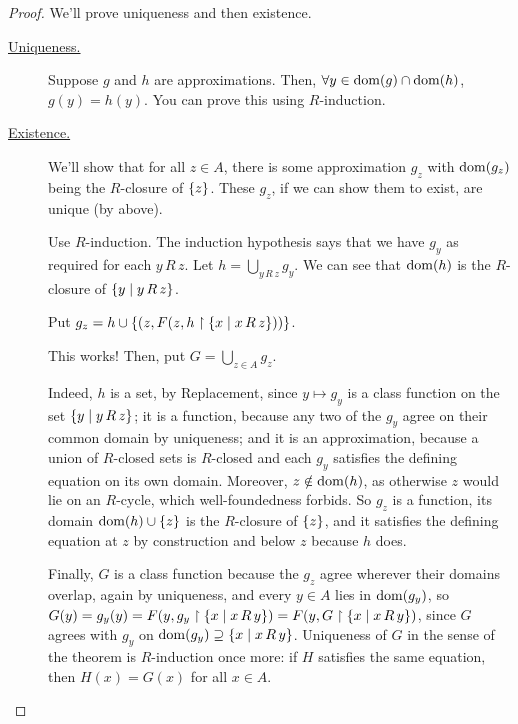 \begin{proof}
    We'll prove uniqueness and then existence.

    \begin{description}
        \item[\underline{Uniqueness.}]
            Suppose $g$ and $h$ are approximations. Then, $\forall y \in \operatorname{dom}\!\left( g \right) \cap \operatorname{dom}\!\left( h \right)$, $g(y) = h(y)$. You can prove this using $R$-induction.

        \item[\underline{Existence.}]
            We'll show that for all $z \in A$, there is some approximation $g_z$ with $\operatorname{dom}\!\left( g_z \right)$ being the $R$-closure of $\left\{ z \right\}$. These $g_z$, if we can show them to exist, are unique (by above).

            Use $R$-induction. The induction hypothesis says that we have $g_y$ as required for each $y \, R \, z$. Let $h = \bigcup_{y \, R \, z} g_y$. We can see that $\operatorname{dom}\!\left( h \right)$ is the $R$-closure of $\left\{ y \; \middle\vert \; y \, R \, z \right\}$.

            Put $g_z = h \cup \left\{ \left( z, F\!\left( z, h \restriction \left\{ x \; \middle\vert \; x \, R \, z \right\} \right) \right) \right\}$.

            This works! Then, put $G = \bigcup_{z \in A} g_z$.

            Indeed, $h$ is a set, by Replacement, since $y \mapsto g_y$ is a class function on the set $\left\{ y \; \middle\vert \; y \, R \, z \right\}$; it is a function, because any two of the $g_y$ agree on their common domain by uniqueness; and it is an approximation, because a union of $R$-closed sets is $R$-closed and each $g_y$ satisfies the defining equation on its own domain. Moreover, $z \notin \operatorname{dom}\!\left( h \right)$, as otherwise $z$ would lie on an $R$-cycle, which well-foundedness forbids. So $g_z$ is a function, its domain $\operatorname{dom}\!\left( h \right) \cup \left\{ z \right\}$ is the $R$-closure of $\left\{ z \right\}$, and it satisfies the defining equation at $z$ by construction and below $z$ because $h$ does.

            Finally, $G$ is a class function because the $g_z$ agree wherever their domains overlap, again by uniqueness, and every $y \in A$ lies in $\operatorname{dom}\!\left( g_y \right)$, so $G(y) = g_y(y) = F\!\left( y, g_y \restriction \left\{ x \; \middle\vert \; x \, R \, y \right\} \right) = F\!\left( y, G \restriction \left\{ x \; \middle\vert \; x \, R \, y \right\} \right)$, since $G$ agrees with $g_y$ on $\operatorname{dom}\!\left( g_y \right) \supseteq \left\{ x \; \middle\vert \; x \, R \, y \right\}$. Uniqueness of $G$ in the sense of the theorem is $R$-induction once more: if $H$ satisfies the same equation, then $H(x) = G(x)$ for all $x \in A$.
    \end{description}
\end{proof}

